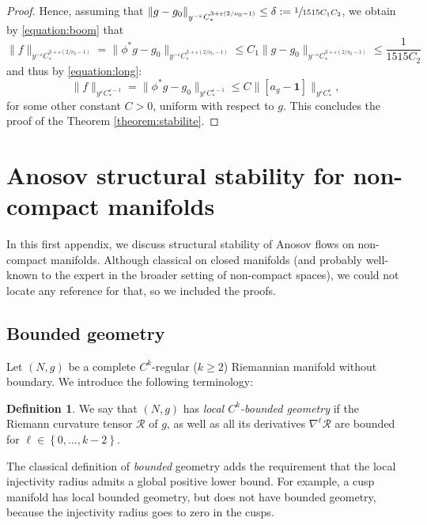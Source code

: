 \documentclass[10pt]{amsart}
\newcommand{\eps}{\varepsilon}
\theoremstyle{plain}
\theoremstyle{definition}
\newtheorem{definition}{Definition}[section]
\begin{document}
\begin{proof}
Hence, assuming that $\| g-g_0 \|_{y^{-\eps} C^{3+\eps(2/\nu_0-1)}_*} \leq \delta := \sfrac{1}{1515 C_1 C_2}$, we obtain by \eqref{equation:boom} that
\[
\|f\|_{y^{-\eps} C^{3+\eps(2/\nu_0-1)}_*} = \|\phi^*g-g_0\|_{y^{-\eps} C^{3+\eps(2/\nu_0-1)}_*} \leq C_1 \|g-g_0\|_{y^{-\eps} C^{3+\eps(2/\nu_0-1)}_*} \leq \frac{1}{1515 C_2}
\]
and thus by \eqref{equation:long}:
\[
\|f\|_{y^\eps C^{\eps-1}_*} = \|\phi^*g-g_0\|_{y^\eps C^{\eps-1}_*} \leq C \|[a_g-\mathbf{1}]\|_{y^\eps C^{\eps}_*},
\]
for some other constant $C > 0$, uniform with respect to $g$. This concludes the proof of the Theorem \ref{theorem:stabilite}.
\end{proof}

\appendix

\section{Anosov structural stability for non-compact manifolds}

\label{appendix:a}

In this first appendix, we discuss structural stability of Anosov flows on non-compact manifolds. Although classical on closed manifolds (and probably well-known to the expert in the broader setting of non-compact spaces), we could not locate any reference for that, so we included the proofs.

\subsection{Bounded geometry}

\label{ssection:bounded-geometry}

Let $(N,g)$ be a complete $C^k$-regular ($k\geq 2$) Riemannian manifold without boundary. We introduce the following terminology:

\begin{definition}
We say that $(N,g)$ has \emph{local $C^k$-bounded geometry} if the Riemann curvature tensor $\mathcal{R}$ of $g$, as well as all its derivatives $\nabla^\ell \mathcal{R}$ are bounded for $\ell \in \left\{0,\dots,k-2\right\}$.
\end{definition}

The classical definition of \emph{bounded} geometry adds the requirement that the local injectivity radius admits a global positive lower bound. For example, a cusp manifold has local bounded geometry, but does not have bounded geometry, because the injectivity radius goes to zero in the cusps.
\end{document}
